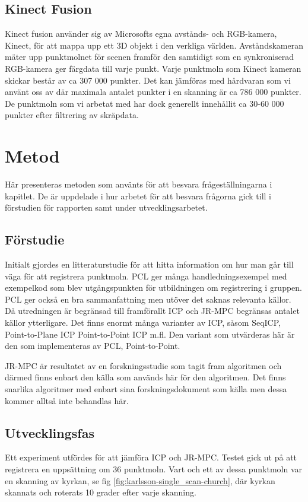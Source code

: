 \subsection{Kinect Fusion}

Kinect fusion använder sig av Microsofts egna avstånds- och RGB-kamera, Kinect, för att mappa upp ett 3D objekt i den verkliga världen. Avståndskameran mäter upp punktmolnet för scenen framför den samtidigt som en synkroniserad RGB-kamera ger färgdata till varje punkt. 
Varje punktmoln som Kinect kameran skickar består av ca 307 000 punkter. Det kan jämföras med hårdvaran som vi använt oss av där maximala antalet punkter i en skanning är ca 786 000 punkter. De punktmoln som vi arbetat med har dock generellt innehållit ca 30-60 000 punkter efter filtrering av skräpdata.

\section{Metod}
\label{sec:method-karlsson}

Här presenteras metoden som använts för att besvara frågeställningarna i kapitlet. De är uppdelade i hur arbetet för att besvara frågorna gick till i förstudien för rapporten samt under utvecklingsarbetet.

\subsection{Förstudie}
Initialt gjordes en litteraturstudie för att hitta information om hur man går till väga för att registrera punktmoln.  PCL ger många handledningsexempel med exempelkod som blev utgångspunkten för utbildningen om registrering i gruppen. PCL ger också en bra sammanfattning men utöver det saknas relevanta källor. Då utredningen är begränsad till framförallt ICP och JR-MPC begränsas antalet källor ytterligare. Det finns enormt många varianter av ICP, såsom SeqICP, Point-to-Plane ICP Point-to-Point ICP m.fl. Den variant som utvärderas här är den som implementeras av PCL, Point-to-Point. 

JR-MPC är resultatet av en forskningsstudie som tagit fram algoritmen och därmed finns enbart den källa som används här för den algoritmen. Det finns snarlika algoritmer med enbart sina forskningsdokument som källa men dessa kommer alltså inte behandlas här.

\subsection{Utvecklingsfas}
Ett experiment utfördes för att jämföra ICP och JR-MPC. Testet gick ut på att registrera en uppsättning om 36 punktmoln. Vart och ett av dessa punktmoln var en skanning av kyrkan, se fig \ref{fig:karlsson-single_scan-church}, där kyrkan skannats och roterats 10 grader efter varje skanning. 

